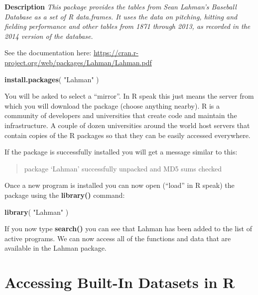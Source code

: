 \documentclass[]{book}
\newenvironment{Shaded}{\begin{snugshade}}{\end{snugshade}}
\newcommand{\KeywordTok}[1]{\textcolor[rgb]{0.13,0.29,0.53}{\textbf{#1}}}
\newcommand{\NormalTok}[1]{#1}
\newcommand{\StringTok}[1]{\textcolor[rgb]{0.31,0.60,0.02}{#1}}
\theoremstyle{definition}
\theoremstyle{definition}
\theoremstyle{definition}
\theoremstyle{remark}
\begin{document}
\textbf{Description} \emph{This package provides the tables from Sean
Lahman's Baseball Database as a set of R data.frames. It uses the data
on pitching, hitting and fielding performance and other tables from 1871
through 2013, as recorded in the 2014 version of the database.}

See the documentation here:
\url{https://cran.r-project.org/web/packages/Lahman/Lahman.pdf}

\begin{Shaded}
\begin{Highlighting}[]

\KeywordTok{install.packages}\NormalTok{( }\StringTok{"Lahman"}\NormalTok{ )}
\end{Highlighting}
\end{Shaded}

You will be asked to select a ``mirror''. In R speak this just means the
server from which you will download the package (choose anything
nearby). R is a community of developers and universities that create
code and maintain the infrastructure. A couple of dozen universities
around the world host servers that contain copies of the R packages so
that they can be easily accessed everywhere.

If the package is successfully installed you will get a message similar
to this:

\begin{quote}
package `Lahman' successfully unpacked and MD5 sums checked
\end{quote}

Once a new program is installed you can now open (``load'' in R speak)
the package using the \textbf{library()} command:

\begin{Shaded}
\begin{Highlighting}[]
\KeywordTok{library}\NormalTok{( }\StringTok{"Lahman"}\NormalTok{ )}
\end{Highlighting}
\end{Shaded}

If you now type \textbf{search()} you can see that Lahman has been added
to the list of active programs. We can now access all of the functions
and data that are available in the Lahman package.

\hypertarget{accessing-built-in-datasets-in-r}{%
\section{Accessing Built-In Datasets in
R}\label{accessing-built-in-datasets-in-r}}
\end{document}
